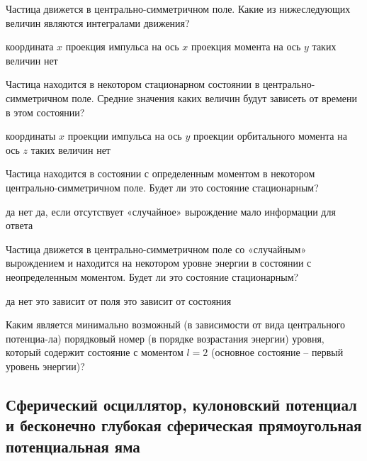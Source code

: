 \documentclass[11pt,a4paper]{exam}
\begin{document}
\begin{questions}
\question Частица движется в центрально-симметричном поле. Какие из нижеследующих величин являются интегралами движения?
\begin{choices}
\choice координата $x$
\choice проекция импульса на ось $x$
\choice проекция момента на ось $y$
\choice таких величин нет
\end{choices}

\question Частица находится в некотором стационарном состоянии в центрально-симметричном поле. Средние значения каких величин будут зависеть от времени в этом состоянии?
\begin{choices}
\choice координаты $x$
\choice проекции импульса на ось $y$
\choice проекции орбитального момента на ось $z$
\choice таких величин нет
\end{choices}

\question Частица находится в состоянии с определенным моментом в некотором центрально-симметричном поле. Будет ли это состояние стационарным?
\begin{choices}
\choice да
\choice нет
\choice да, если отсутствует «случайное» вырождение
\choice мало информации для ответа 
\end{choices}

\question Частица движется в центрально-симметричном поле со «случайным» вырождением и находится на некотором уровне энергии в состоянии с неопределенным моментом. Будет ли это состояние стационарным?
\begin{choices}
\choice да    
\choice нет      
\choice это зависит от поля     
\choice это зависит от состояния
\end{choices}

\question Каким является минимально возможный (в зависимости от вида центрального потенциа-ла) порядковый номер (в порядке возрастания энергии) уровня, который содержит состояние с моментом $l = 2$ (основное состояние – первый уровень энергии)?
\begin{choices}
\end{choices}

\end{questions}

\subsection{ Сферический осциллятор, кулоновский потенциал и бесконечно глубокая сферическая прямоугольная потенциальная яма }
\end{document}
